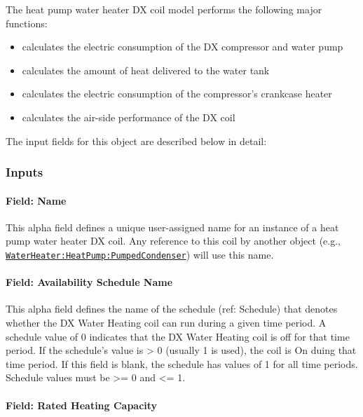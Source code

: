 The heat pump water heater DX coil model performs the following major functions:

\begin{itemize}
\item
  calculates the electric consumption of the DX compressor and water pump
\item
  calculates the amount of heat delivered to the water tank
\item
  calculates the electric consumption of the compressor's crankcase heater
\item
  calculates the air-side performance of the DX coil
\end{itemize}

The input fields for this object are described below in detail:

\subsubsection{Inputs}\label{inputs-27}

\paragraph{Field: Name}\label{field-name-26-000}

This alpha field defines a unique user-assigned name for an instance of a heat pump water heater DX coil. Any reference to this coil by another object (e.g., \hyperref[waterheaterheatpumppumpedcondenser]{\lstinline!WaterHeater:HeatPump:PumpedCondenser!}) will use this name.

\paragraph{Field: Availability Schedule Name}\label{field-availability-schedule-name-16-003}

This alpha field defines the name of the schedule (ref: Schedule) that denotes whether the DX Water Heating coil can run during a given time period. A schedule value of 0 indicates that the DX Water Heating coil is off for that time period. If the schedule's value is \textgreater{} 0 (usually 1 is used), the coil is On duing that time period. If this field is blank, the schedule has values of 1 for all time periods. Schedule values must be \textgreater{}= 0 and \textless{}= 1.

\paragraph{Field: Rated Heating Capacity}\label{field-rated-heating-capacity}

